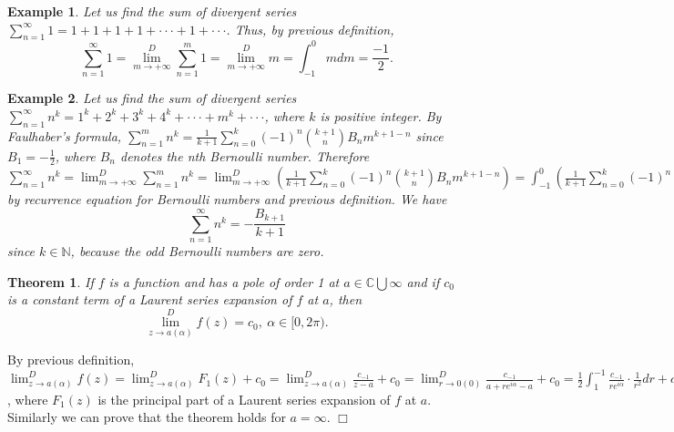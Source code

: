 \documentclass[12pt]{article}
\def\N{{\mathbb N}}
\def\Co{{\mathbb C}}
\newtheorem{thm}{Theorem}[section]
\newtheorem{ex}{Example}[section]
\newenvironment{proof}{\noindent {\sc Proof:}}{$\Box$ \medskip}
\begin{document}
\begin{ex}
Let us find the sum of divergent series $\sum_{n=1}^{\infty}1=1+1+1+1+\cdot\cdot\cdot +1+\cdot\cdot\cdot$. Thus, by previous definition, $$\sum_{n=1}^{\infty}1=\lim^D_{m\to+\infty}\sum_{n=1}^m 1=\lim^D_{m\to+\infty}m=\int_{-1}^0 m dm=\frac{-1}{2}.$$ 
\end{ex}

\begin{ex}
Let us find the sum of divergent series $\sum_{n=1}^{\infty}n^k=1^k+2^k+3^k+4^k+\cdot\cdot\cdot +m^k+\cdot\cdot\cdot$,  where $k$ is positive integer. By Faulhaber's formula, $\sum_{n=1}^{m}n^k=\frac{1}{k+1}\sum_{n=0}^k (-1)^n{{k+1}\choose{n}} B_n m^{k+1-n}$ since $B_1=-\frac{1}{2}$, where $B_n$ denotes the nth Bernoulli number. Therefore  $\sum_{n=1}^{\infty}n^k= \lim^D_{m\to+\infty}\sum_{n=1}^m n^k=
\lim^D_{m\to+\infty}(\frac{1}{k+1}\sum_{n=0}^k (-1)^n{{k+1}\choose{n}} B_n m^{k+1-n})= 
\int_{-1}^0(\frac{1}{k+1}\sum_{n=0}^k (-1)^n{{k+1}\choose{n}} B_n  m^{k+1-n})dm=
\frac{1}{k+1}\sum_{n=0}^k (-1)^n{{k+1}\choose{n}} B_n  \int_{-1}^0 m^{k+1-n}dm=
-\frac{1}{k+1}\sum_{n=0}^k (-1)^n{{k+1}\choose{n}} B_n \frac{(-1)^{k+2-n}}{k+2-n}=
-\frac{1}{k+1}\sum_{n=0}^k {{k+1}\choose{n}} B_n \frac{(-1)^{k}}{k+2-n}=
\frac{(-1)^{k}}{k+1}\cdot(-\sum_{n=0}^k {{k+1}\choose{n}} \frac{B_n}{k+2-n})=
\frac{(-1)^{k}}{k+1}\cdot B_{k+1}$ by recurrence equation for Bernoulli numbers and previous definition.
We have $$\sum_{n=1}^{\infty}n^k=-\frac{B_{k+1}}{k+1}$$ since $k\in \N$, because the odd Bernoulli numbers are zero.
\end{ex}

\begin{thm}
If $f$ is a function and has a pole of order 1 at $a \in \Co\bigcup\infty$ and if $c_0$ is a constant term of a Laurent series expansion of $f$ at $a$, then $$\lim^D_{z\to a(\alpha)}f(z)=c_0,\ \alpha\in[0,2\pi).$$
\end{thm}

\begin{proof}
By previous definition,
$\lim^D_{z\to a(\alpha)}f(z)=\lim^D_{z\to a(\alpha)}F_1(z)+c_0=
\lim^D_{z\to a(\alpha)}\frac{c_{-1}}{z-a}+c_0=\lim^D_{r\to 0(0)}\frac{c_{-1}}{a+re^{i\alpha}-a}+c_0=
\frac{1}{2}\int_1^{-1}\frac{c_{-1}}{re^{i\alpha}}\cdot\frac{1}{r^2}dr+c_0=\frac{c_{-1}}{2e^{i\alpha}}\int_1^{-1}\frac{1}{r^3}dr+c_0 
=0+c_0=c_0$, where $F_1(z)$ is the principal part of a Laurent series expansion of $f$ at $a$.
Similarly we can prove that the theorem holds for $a=\infty$.
\end{proof}
\end{document}
